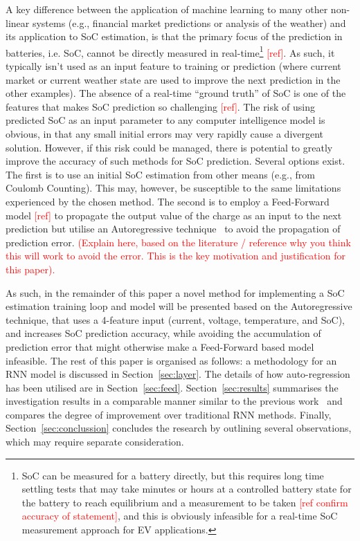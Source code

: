 %
%
A key difference between the application of machine learning to many other non-linear systems (e.g., financial market predictions or analysis of the weather) and its application to SoC estimation, is that the primary focus of the prediction in batteries, i.e. SoC, cannot be directly measured in real-time\footnote{SoC can be measured for a battery directly, but this requires long time settling tests that may take minutes or hours at a controlled battery state for the battery to reach equilibrium and a measurement to be taken \textcolor{red}{[ref confirm accuracy of statement]}, and this is obviously infeasible for a real-time SoC measurement approach for EV applications.} \textcolor{red}{[ref]}.
As such, it typically isn't used as an input feature to training or prediction (where current market or current weather state are used to improve the next prediction in the other examples).
The absence of a real-time “ground truth” of SoC is one of the features that makes SoC prediction so challenging \textcolor{red}{[ref]}.
The risk of using predicted SoC as an input parameter to any computer intelligence model is obvious, in that any small initial errors may very rapidly cause a divergent solution.
However, if this risk could be managed, there is potential to greatly improve the accuracy of such methods for SoC prediction.
Several options exist.
The first is to use an initial SoC estimation from other means (e.g., from Coulomb Counting).
This may, however, be susceptible to the same limitations experienced by the chosen method.
The second is to employ a Feed-Forward model \textcolor{red}{[ref]} to propagate the output value of the charge as an input to the next prediction but utilise an Autoregressive technique~\cite{time_2020} to avoid the propagation of prediction error.
\textcolor{red}{(Explain here, based on the literature / reference why you think this will work to avoid the error. This is the key motivation and justification for this paper).}

%
%
As such, in the remainder of this paper a novel method for implementing a SoC estimation training loop and model will be presented based on the Autoregressive technique, that uses a 4-feature input (current, voltage, temperature, and SoC), and increases SoC prediction accuracy, while avoiding the accumulation of prediction error that might otherwise make a Feed-Forward based model infeasible.
The rest of this paper is organised as follows: a methodology for an RNN model is discussed in Section~\ref{sec:layer}.
The details of how auto-regression has been utilised are in Section~\ref{sec:feed}.
Section~\ref{sec:results} summarises the investigation results in a comparable manner similar to the previous work~\cite{sadykov_practical_2022} and compares the degree of improvement over traditional RNN methods.
Finally, Section~\ref{sec:conclussion} concludes the research by outlining several observations, which may require separate consideration.

